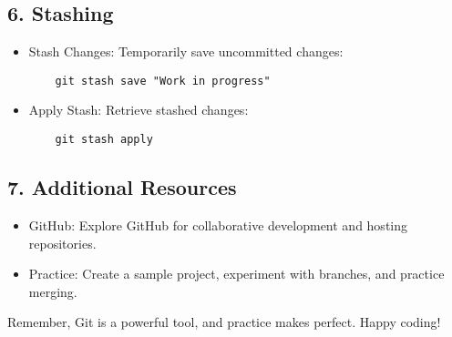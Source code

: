 \documentclass{article}
\begin{document}
\subsection*{6. Stashing}
\begin{itemize}
    \item Stash Changes: Temporarily save uncommitted changes:
    \begin{verbatim}
    git stash save "Work in progress"
    \end{verbatim}
    \item Apply Stash: Retrieve stashed changes:
    \begin{verbatim}
    git stash apply
    \end{verbatim}
\end{itemize}

\subsection*{7. Additional Resources}
\begin{itemize}
    \item GitHub: Explore GitHub for collaborative development and hosting repositories.
    \item Practice: Create a sample project, experiment with branches, and practice merging.
\end{itemize}

Remember, Git is a powerful tool, and practice makes perfect. Happy coding!
\end{document}
